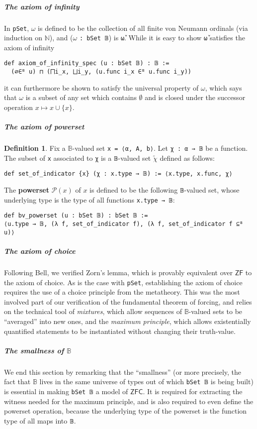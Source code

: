 \documentclass[a4paper,USenglish,cleveref, autoref]{lipics-v2019}
\newcommand{\B}{\mathbb{B}}
\newcommand{\lil}{\lstinline}
\theoremstyle{theorem}
\theoremstyle{definition}
\newtheorem{defn}[definition]{Definition}
\begin{document}
\subparagraph*{The axiom of infinity}
In \lil{pSet}, $\omega$ is defined to be the collection of all finite von Neumann ordinals (via induction on $\mathbb{N}$), and ($\omega$ \lil{: bSet 𝔹}) is \lil{ω̌}. While it is easy to show \lil{ω̌} satisfies the axiom of infinity
\begin{lstlisting}
def axiom_of_infinity_spec (u : bSet 𝔹) : 𝔹 :=
  (∅∈ᴮ u) ⊓ (⨅i_x, ⨆i_y, (u.func i_x ∈ᴮ u.func i_y))
\end{lstlisting}
it can furthermore be shown to satisfy the universal property of $\omega$, which says that $\omega$ is a subset of any set which contains $\emptyset$ and is closed under the successor operation $x \mapsto x \cup \{x\}$.

\subparagraph*{The axiom of powerset}
\begin{defn} \label{def-powerset}
  Fix a $\B$-valued set \lil{x = ⟨α, A, b⟩}. Let \lil{χ : α → 𝔹} be a function. The subset of \lil{x} associated to \lil{χ} is a \lil{𝔹}-valued set $\widetilde{\chi}$ defined as follows:
\begin{lstlisting}
def set_of_indicator {x} (χ : x.type → 𝔹) := ⟨x.type, x.func, χ⟩
\end{lstlisting}

The \textbf{powerset} $\mathcal{P}(x)$ of $x$ is defined to be the following \lil{𝔹}-valued set, whose underlying type is the type of all functions \lil{x.type → 𝔹}:
\begin{lstlisting}
def bv_powerset (u : bSet 𝔹) : bSet 𝔹 :=
⟨u.type → 𝔹, (λ f, set_of_indicator f), (λ f, set_of_indicator f ⊆ᴮ u)⟩
\end{lstlisting}
\end{defn}

\subparagraph*{The axiom of choice}
Following Bell, we verified Zorn's lemma, which is provably equivalent over $\mathsf{ZF}$ to the axiom of choice. As is the case with \lil{pSet}, establishing the axiom of choice requires the use of a choice principle from the metatheory. This was the most involved part of our verification of the fundamental theorem of forcing, and relies on the technical tool of \emph{mixtures}, which allow sequences of $\B$-valued sets to be ``averaged'' into new ones, and the \emph{maximum principle}, which allows existentially quantified statements to be instantiated without changing their truth-value.

\subparagraph*{The smallness of $\B$}
We end this section by remarking that the ``smallness'' (or more precisely, the fact that $\B$ lives in the same universe of types out of which \lil{bSet 𝔹} is being built) is essential in making \lstinline{bSet 𝔹} a model of $\mathsf{ZFC}$. It is required for extracting the witness needed for the maximum principle, and is also required to even define the powerset operation, because the underlying type of the powerset is the function type of all maps into \lstinline{𝔹}.
\end{document}
